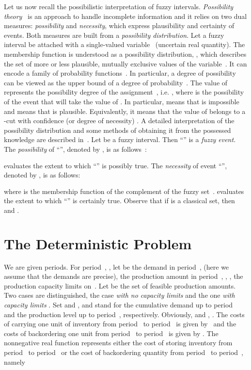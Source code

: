 \documentclass[11pt]{article}
\begin{document}
Let us now recall the possibilistic interpretation of fuzzy intervals.
\emph{Possibility theory}~\cite{DP88} is an approach to handle  incomplete
information and it
relies on two dual measures: \emph{possibility} and
\emph{necessity}, which express plausibility and certainty of events.
 Both measures
are built from a \emph{possibility distribution}. 
Let a fuzzy interval  be attached with 
a single-valued variable~ (uncertain real quantity). 
The membership function  is understood as
a possibility distribution, , which 
describes the set of more or less plausible,
mutually exclusive values of the variable~. 
It  can encode a family of probability functions~\cite{DP92}. In particular, a degree of possibility can be viewed as
the upper bound of a degree of probability~\cite{DP92}.
The value of   represents the possibility degree of the assignment~, i.e.
,
 where  is the possibility of the event that 
  will take the value of .
In particular,  
means that  is impossible 
and  means that  is plausible. 
Equivalently,
 it means that the value of  
belongs to a -cut  with
confidence (or degree of necessity) .
A detailed interpretation of the possibility distribution and some methods of obtaining it from the possessed knowledge are described in~\cite{DP88,DP94}. 
Let  be a fuzzy interval. Then ``''
is a \emph{fuzzy event}.
The \emph{possibility} of ``'', 
denoted by , is
as follows~\cite{DFF03}: 

 evaluates the extent to which  
``''  is possibly true. 
The \emph{necessity}   of  event
``'', denoted by 
, is
as follows: 

where  is the membership function
of the complement of the fuzzy set~. 
 evaluates the extent to which  
``'' is certainly true. Observe that if  is a classical set, then  and .



\section{The Deterministic Problem}
\label{sdlsp}


We are given  periods. For period~, ,
let  be the demand in period~, 
(here we assume that the demands are precise),  the production
amount in period~, , ,  the production capacity limits on~. 
Let 
be the set of feasible production amounts.
Two cases are distinguished, the case
\emph{with no capacity limits} 
and the one \emph{with capacity limits}
.
Set  and
 ,
  and   stand for
 the cumulative demand up to period~
and  the production level up to period~, respectively.
Obviously,  and 
, .
The costs of carrying one unit of 
inventory from period~ to period~ is given by~
and
the costs of backordering one unit 
from period~ to period~ is given by . 
The nonnegative real function  represents either the cost of storing inventory 
from period~ to period~
or  the cost of backordering quantity from period~ to
period~,
namely
\end{document}
